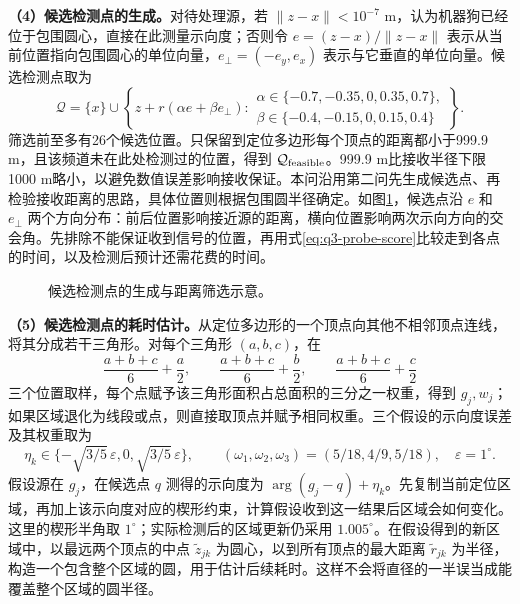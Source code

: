 \textbf{（4）候选检测点的生成。}对待处理源，若 $\|z-x\|<10^{-7}$ m，认为机器狗已经位于包围圆心，直接在此测量示向度；否则令 $e=(z-x)/\|z-x\|$ 表示从当前位置指向包围圆心的单位向量，$e_\perp=(-e_y,e_x)$ 表示与它垂直的单位向量。候选检测点取为
\begin{equation}\label{eq:q3-probe-candidates}
\mathcal Q=\{x\}\cup
\left\{z+r(\alpha e+\beta e_\perp):
\begin{array}{l}
\alpha\in\{-0.7,-0.35,0,0.35,0.7\},\\
\beta\in\{-0.4,-0.15,0,0.15,0.4\}
\end{array}\right\}.
\end{equation}
筛选前至多有26个候选位置。只保留到定位多边形每个顶点的距离都小于999.9 m，且该频道未在此处检测过的位置，得到 $\mathcal Q_{\rm feasible}$。999.9 m比接收半径下限1000 m略小，以避免数值误差影响接收保证。本问沿用第二问先生成候选点、再检验接收距离的思路，具体位置则根据包围圆半径确定。如图\ref{fig:q3-probe}，候选点沿 $e$ 和 $e_\perp$ 两个方向分布：前后位置影响接近源的距离，横向位置影响两次示向方向的交会角。先排除不能保证收到信号的位置，再用式\eqref{eq:q3-probe-score}比较走到各点的时间，以及检测后预计还需花费的时间。

\begin{figure}[!htbp]
\centering
\QThreeProbeFigure
\caption{候选检测点的生成与距离筛选示意。}
\label{fig:q3-probe}
\end{figure}


\textbf{（5）候选检测点的耗时估计。}从定位多边形的一个顶点向其他不相邻顶点连线，将其分成若干三角形。对每个三角形 $(a,b,c)$，在
\[
\frac{a+b+c}{6}+\frac a2,\qquad
\frac{a+b+c}{6}+\frac b2,\qquad
\frac{a+b+c}{6}+\frac c2
\]
三个位置取样，每个点赋予该三角形面积占总面积的三分之一权重，得到 $g_j,w_j$；如果区域退化为线段或点，则直接取顶点并赋予相同权重。三个假设的示向度误差及其权重取为
\[
\eta_k\in\{-\sqrt{3/5}\,\varepsilon,0,\sqrt{3/5}\,\varepsilon\},
\qquad (\omega_1,\omega_2,\omega_3)=(5/18,4/9,5/18),\quad \varepsilon=1^\circ.
\]
假设源在 $g_j$，在候选点 $q$ 测得的示向度为 $\arg(g_j-q)+\eta_k$。先复制当前定位区域，再加上该示向度对应的楔形约束，计算假设收到这一结果后区域会如何变化。这里的楔形半角取 $1^\circ$；实际检测后的区域更新仍采用 $1.005^\circ$。在假设得到的新区域中，以最远两个顶点的中点 $\widetilde z_{jk}$ 为圆心，以到所有顶点的最大距离 $\widetilde r_{jk}$ 为半径，构造一个包含整个区域的圆，用于估计后续耗时。这样不会将直径的一半误当成能覆盖整个区域的圆半径。

